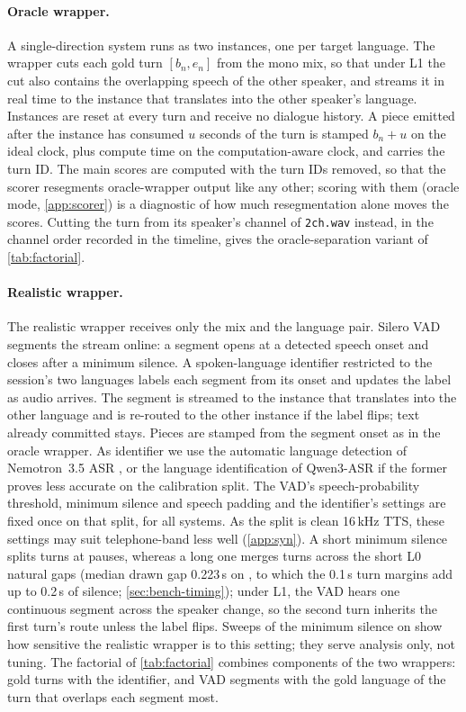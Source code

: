 \paragraph{Oracle wrapper.}
A single-direction system runs as two instances, one per target language. The wrapper cuts each gold turn $[b_n,e_n]$ from the mono mix, so that under L1 the cut also contains the overlapping speech of the other speaker, and streams it in real time to the instance that translates into the other speaker's language. Instances are reset at every turn and receive no dialogue history. A piece emitted after the instance has consumed $u$ seconds of the turn is stamped $b_n+u$ on the ideal clock, plus compute time on the computation-aware clock, and carries the turn ID. The main scores are computed with the turn IDs removed, so that the scorer resegments oracle-wrapper output like any other; scoring with them (oracle mode, \cref{app:scorer}) is a diagnostic of how much resegmentation alone moves the scores. Cutting the turn from its speaker's channel of \texttt{2ch.wav} instead, in the channel order recorded in the timeline, gives the oracle-separation variant of \cref{tab:factorial}.

\paragraph{Realistic wrapper.}
The realistic wrapper receives only the mix and the language pair. Silero VAD \citep{silero2024silero} segments the stream online: a segment opens at a detected speech onset and closes after a minimum silence. A spoken-language identifier restricted to the session's two languages labels each segment from its onset and updates the label as audio arrives. The segment is streamed to the instance that translates into the other language and is re-routed to the other instance if the label flips; text already committed stays. Pieces are stamped from the segment onset as in the oracle wrapper. As identifier we use the automatic language detection of Nemotron~3.5 ASR \citep{nvidia2026nemotron35asr}, or the language identification of Qwen3-ASR \citep{shi2026qwen3asr} if the former proves less accurate on the calibration split. The VAD's speech-probability threshold, minimum silence and speech padding and the identifier's settings are fixed once on that split, for all systems. As the split is clean 16\,kHz TTS, these settings may suit telephone-band \taxi less well (\cref{app:syn}). A short minimum silence splits turns at pauses, whereas a long one merges turns across the short L0 natural gaps (median drawn gap 0.223\,s on \taxi, to which the 0.1\,s turn margins add up to 0.2\,s of silence; \cref{sec:bench-timing}); under L1, the VAD hears one continuous segment across the speaker change, so the second turn inherits the first turn's route unless the label flips. Sweeps of the minimum silence on \taxi show how sensitive the realistic wrapper is to this setting; they serve analysis only, not tuning. The factorial of \cref{tab:factorial} combines components of the two wrappers: gold turns with the identifier, and VAD segments with the gold language of the turn that overlaps each segment most.

